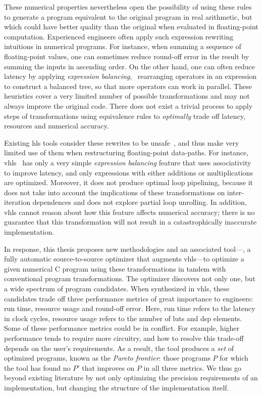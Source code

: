 These numerical properties nevertheless open the possibility of using these
rules to generate a program equivalent to the original program in real
arithmetic, but which could have better quality than the original when
evaluated in floating-point computation.  Experienced engineers often apply
such expression rewriting intuitions in numerical programs.  For instance,
when summing a sequence of floating-point values, one can sometimes reduce
round-off error in the result by summing the inputs in ascending order.  On
the other hand, one can often reduce latency by applying \emph{expression
balancing}, \ie~rearranging operators in an expression to construct a balanced
tree, so that more operators can work in parallel.  These heuristics cover a
very limited number of possible transformations and may not always improve
the original code.  There does not exist a trivial process to apply steps of
transformations using equivalence rules to \emph{optimally} trade off latency,
resources and numerical accuracy.

Existing \gls{hls} tools consider these rewrites to be
unsafe~\cite{vivado_hls}, and thus make very limited use of them
when restructuring floating-point data-paths.  For instance,
\gls{vhls}~\cite{vivado_hls} has only a very simple \emph{expression balancing}
feature that uses associativity to improve latency, and only expressions with
either additions or multiplications are optimized.  Moreover, it does not
produce optimal loop pipelining, because it does not take into account the
implications of these transformations on inter-iteration dependences and does
not explore partial loop unrolling.  In addition, \gls{vhls} cannot reason
about how this feature affects numerical accuracy; there is no guarantee
that this transformation will not result in a catastrophically inaccurate
implementation.

In response, this thesis proposes new methodologies and an associated
tool---\soap, a fully automatic source-to-source optimizer that augments
\gls{vhls}---to optimize a given numerical C program using these
transformations in tandem with conventional program transformations.  The
optimizer discovers not only one, but a wide spectrum of program candidates.
When synthesized in \gls{vhls}, these candidates trade off three performance
metrics of great importance to engineers: run time, resource usage and
round-off error.  Here, run time refers to the latency in clock cycles,
resource usage refers to the number of \glspl{lut} and \gls{dsp} elements.
Some of these performance metrics could be in conflict.  For example, higher
performance tends to require more circuitry, and how to resolve this trade-off
depends on the user's requirements.  As a result, the tool produces a
\emph{set} of optimized programs, known as the \emph{Pareto frontier}: those
programs $P$ for which the tool has found no $P'$ that improves on $P$ in all
three metrics.  We thus go beyond existing literature by not only optimizing
the precision requirements of an implementation, but changing the structure of
the implementation itself.

